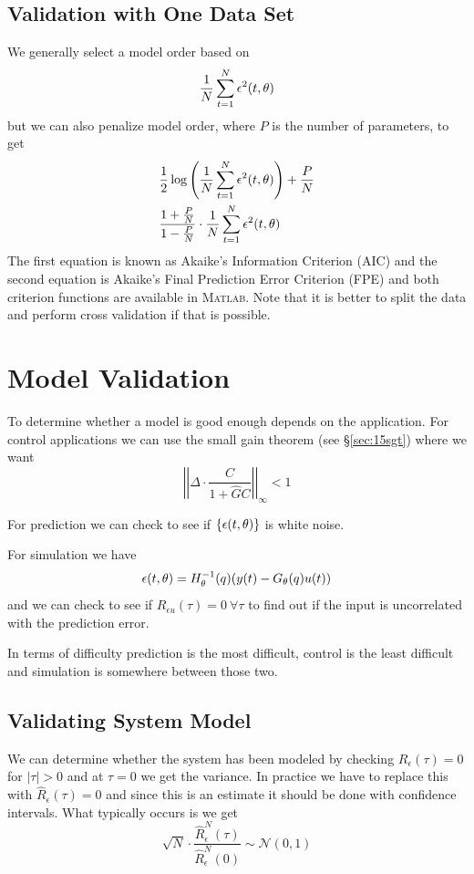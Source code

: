 \subsection{Validation with One Data Set}
We generally select a model order based on
$$\frac{1}{N}\sum_{t=1}^N\epsilon^2(t,\theta)$$
but we can also penalize model order, where $P$ is the number of parameters, to get
\begin{align*}
&\frac{1}{2}\log\left(\frac{1}{N}\sum_{t=1}^N\epsilon^2(t,\theta)\right) + \frac{P}{N} \\
&\frac{1+\frac{P}{N}}{1-\frac{P}{N}}\cdot\frac{1}{N}\sum_{t=1}^N\epsilon^2(t,\theta)
\end{align*}
The first equation is known as Akaike's Information Criterion (AIC) and the second equation is Akaike's Final Prediction Error Criterion (FPE) and both criterion functions are available in \textsc{Matlab}. Note that it is better to split the data and perform cross validation if that is possible.

\section{Model Validation}
To determine whether a model is good enough depends on the application. For control applications we can use the small gain theorem (see \S\ref{sec:15sgt}) where we want
$$\left|\left|\Delta\cdot\frac{C}{1+\hat{G}C}\right|\right|_\infty < 1$$

For prediction we can check to see if $\{\epsilon(t,\theta)\}$ is white noise.

For simulation we have
$$\epsilon(t,\theta) = H_\theta^{-1}(q)(y(t)-G_\theta(q)u(t))$$
and we can check to see if $R_{\epsilon u}(\tau)=0 ~\forall \tau$ to find out if the input is uncorrelated with the prediction error.

In terms of difficulty prediction is the most difficult, control is the least difficult and simulation is somewhere between those two.

\subsection{Validating System Model}
We can determine whether the system has been modeled by checking $R_\epsilon(\tau)=0$ for $|\tau|>0$ and at $\tau=0$ we get the variance. In practice we have to replace this with $\hat{R}_\epsilon(\tau)=0$ and since this is an estimate it should be done with confidence intervals. What typically occurs is we get
$$\sqrt{N}\cdot\frac{\hat{R}_\epsilon^N(\tau)}{\hat{R}_\epsilon^N(0)} \sim \mathcal{N}(0,1)$$

